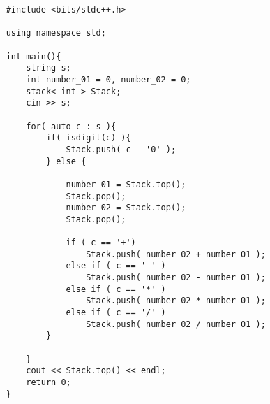 \begin{lstlisting}
    #include <bits/stdc++.h>

    using namespace std;

    int main(){
        string s;
        int number_01 = 0, number_02 = 0;
        stack< int > Stack;
        cin >> s;

        for( auto c : s ){
            if( isdigit(c) ){
                Stack.push( c - '0' );
            } else {

                number_01 = Stack.top();
                Stack.pop();
                number_02 = Stack.top();
                Stack.pop();

                if ( c == '+')
                    Stack.push( number_02 + number_01 );
                else if ( c == '-' )
                    Stack.push( number_02 - number_01 );
                else if ( c == '*' )
                    Stack.push( number_02 * number_01 );
                else if ( c == '/' )
                    Stack.push( number_02 / number_01 );
            }
            
        }
        cout << Stack.top() << endl;
        return 0;
    }
\end{lstlisting}